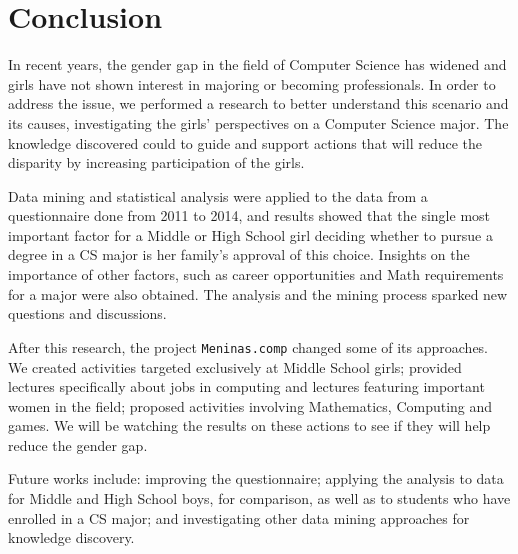 \section{Conclusion}\label{sec:conclusion}%

In recent years, the gender gap in the field of Computer Science has widened and girls have not shown interest in majoring or becoming professionals. In order to address the issue, we performed a research to better understand this scenario and its causes, investigating the girls' perspectives on a Computer Science major. The knowledge discovered could to guide and support actions that will reduce the disparity by increasing participation of the girls.

Data mining and statistical analysis were applied to the data from a questionnaire done from 2011 to 2014, and results showed that the single most important factor for a Middle or High School girl deciding whether to pursue a degree in a CS major is her family's approval of this choice. Insights on the importance of other factors, such as career opportunities and Math requirements for a major were also obtained. The analysis and the mining process sparked new questions and discussions.

After this research, the project \texttt{Meninas.comp} changed some of its approaches. We created activities targeted exclusively at Middle School girls; provided  lectures specifically about jobs in computing and lectures featuring important women in the field; proposed activities involving Mathematics, Computing and games. We will be watching the results on these actions to see if they will help reduce the gender gap.

Future works include: improving the questionnaire; applying the analysis to data for Middle and High School boys, for comparison, as well as to students who have enrolled in a CS major; and investigating other data mining approaches for knowledge discovery.

